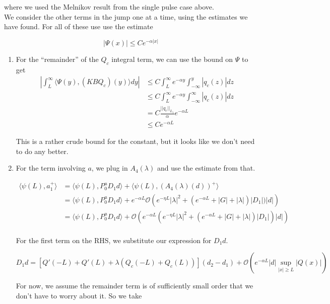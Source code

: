 \documentclass[12pt]{article}
\begin{document}
where we used the Melnikov result from the single pulse case above.\\

We consider the other terms in the jump one at a time, using the estimates we have found. For all of these use use the estimate

\[
|\Psi(x)| \leq C e^{-\alpha|x|}
\]

\begin{enumerate}

\item For the ``remainder'' of the $Q_c$ integral term, we can use the bound on $\Psi$ to get 
\begin{align*}
\left| \int_L^\infty \langle \Psi(y), (K B Q_c)(y) \rangle dy \right| &\leq C \int_L^\infty e^{-\alpha y} \int_{-\infty}^y |q_c(z)| dz\\
&\leq C \int_L^\infty e^{-\alpha y} \int_{-\infty}^\infty |q_c(z)| dz\\
&= C \frac{||q_c||_{L_1}}{\alpha}e^{-\alpha L} \\
&\leq C e^{-\alpha L} 
\end{align*}

This is a rather crude bound for the constant, but it looks like we don't need to do any better.

\item For the term involving $a$, we plug in $A_4(\lambda)$ and use the estimate from that. 

\begin{align*}
\langle \psi(L), a_1^+ \rangle &= \langle \psi(L), P_0^u D_1 d \rangle + \langle \psi(L), (A_4(\lambda)(d))^+\rangle\\
&= \langle \psi(L), P_0^u D_1 d \rangle + e^{-\alpha L} \mathcal{O} \left( e^{-\eta L}|\lambda|^2 + (e^{-\alpha L} + |G| + |\lambda|)|D_1|)|d| \right)\\
&= \langle \psi(L), P_0^u D_1 d \rangle + \mathcal{O} \left( e^{-\alpha L} (e^{-\eta L}|\lambda|^2 + (e^{-\alpha L} + |G| + |\lambda|)|D_1|)|d| \right)\\
\end{align*}

For the first term on the RHS, we substitute our expression for $D_1 d$.

\[
D_1 d = [Q'(-L) + Q'(L) + \lambda(Q_c(-L) + Q_c(L))](d_2 - d_1) + \mathcal{O}\left(e^{-\alpha L} |d| \sup_{|x| \geq L} |Q(x)| \right)
\]

For now, we assume the remainder term is of sufficiently small order that we don't have to worry about it. So we take


\end{enumerate}
\end{document}
